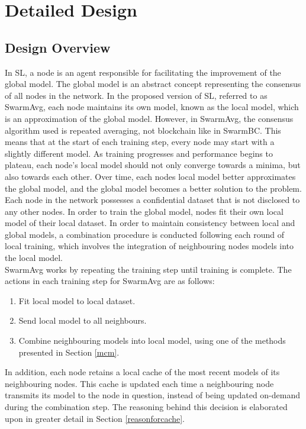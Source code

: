 \chapter{Detailed Design} \label{des}
\section{Design Overview}
In SL, a node is an agent responsible for facilitating the improvement of the global model. The global model is an abstract concept representing the consensus of all nodes in the network. In the proposed version of SL, referred to as SwarmAvg, each node maintains its own model, known as the local model, which is an approximation of the global model. However, in SwarmAvg, the consensus algorithm used is repeated averaging, not blockchain like in SwarmBC. This means that at the start of each training step, every node may start with a slightly different model. As training progresses and performance begins to plateau, each node's local model should not only converge towards a minima, but also towards each other. Over time, each nodes local model better approximates the global model, and the global model becomes a better solution to the problem. \\

Each node in the network possesses a confidential dataset that is not disclosed to any other nodes. In order to train the global model, nodes fit their own local model of their local dataset. In order to maintain consistency between local and global models, a combination procedure is conducted following each round of local training, which involves the integration of neighbouring nodes models into the local model. \\

SwarmAvg works by repeating the training step until training is complete. The actions in each training step for SwarmAvg are as follows:
\begin{enumerate}
	\item Fit local model to local dataset.
	\item Send local model to all neighbours.
	\item Combine neighbouring models into local model, using one of the methods presented in Section \ref{mcm}.
\end{enumerate}

In addition, each node retains a local cache of the most recent models of its neighbouring nodes. This cache is updated each time a neighbouring node transmits its model to the node in question, instead of being updated on-demand during the combination step. The reasoning behind this decision is elaborated upon in greater detail in Section \ref{reasonforcache}.

